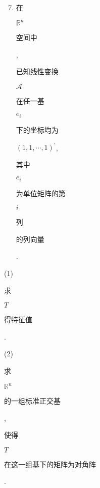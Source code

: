 \documentclass[10pt]{article}
\begin{document}
\begin{enumerate}
  \setcounter{enumi}{6}
  \item \begin{CJK}{UTF8}{mj}在\end{CJK} $\mathbb{R}^{n}$ \begin{CJK}{UTF8}{mj}空间中\end{CJK}, \begin{CJK}{UTF8}{mj}已知线性变换\end{CJK} $\mathscr{A}$ \begin{CJK}{UTF8}{mj}在任一基\end{CJK} $e_{i}$ \begin{CJK}{UTF8}{mj}下的坐标均为\end{CJK} $(1,1, \cdots, 1)^{\prime}$, \begin{CJK}{UTF8}{mj}其中\end{CJK} $e_{i}$ \begin{CJK}{UTF8}{mj}为单位矩阵的第\end{CJK} $i$ \begin{CJK}{UTF8}{mj}列\end{CJK} \begin{CJK}{UTF8}{mj}的列向量\end{CJK}.
\end{enumerate}
(1) \begin{CJK}{UTF8}{mj}求\end{CJK} $T$ \begin{CJK}{UTF8}{mj}得特征值\end{CJK}.

(2) \begin{CJK}{UTF8}{mj}求\end{CJK} $\mathbb{R}^{n}$ \begin{CJK}{UTF8}{mj}的一组标准正交基\end{CJK}, \begin{CJK}{UTF8}{mj}使得\end{CJK} $T$ \begin{CJK}{UTF8}{mj}在这一组基下的矩阵为对角阵\end{CJK}.
\end{document}
